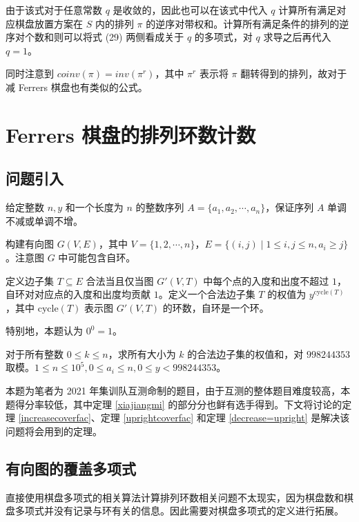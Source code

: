 \documentclass{noithesis}
\begin{document}
	由于该式对于任意常数 $q$ 是收敛的，因此也可以在该式中代入 $q$ 计算所有满足对应棋盘放置方案在 $S$ 内的排列 $\pi$ 的逆序对带权和。计算所有满足条件的排列的逆序对个数和则可以将式 (29) 两侧看成关于 $q$ 的多项式，对 $q$ 求导之后再代入 $q=1$。
	
	同时注意到 $coinv(\pi) = inv(\pi^r)$，其中 $\pi^r$ 表示将 $\pi$ 翻转得到的排列，故对于减 Ferrers 棋盘也有类似的公式。
	
	\section{Ferrers 棋盘的排列环数计数}
	
	\subsection{问题引入}
	
	\begin{problem}
	给定整数 $n,y$ 和一个长度为 $n$ 的整数序列 $A = \{a_1,a_2,\cdots,a_n\}$，保证序列 $A$ 单调不减或单调不增。
	
	构建有向图 $G(V,E)$，其中 $V = \{1,2,\cdots,n\}$，$E = \{(i,j) \mid 1 \leq i,j \leq n, a_i \geq j\}$。注意图 $G$ 中可能包含自环。
	
	定义边子集 $T \subseteq E$ 合法当且仅当图 $G'(V,T)$ 中每个点的入度和出度不超过 $1$，自环对对应点的入度和出度均贡献 $1$。定义一个合法边子集 $T$ 的权值为 $y^{\mathrm{cycle}(T)}$，其中 $\mathrm{cycle}(T)$ 表示图 $G'(V,T)$ 的环数，自环是一个环。
		
	特别地，本题认为 $0^0=1$。
	
	对于所有整数 $0 \leq k \leq n$，求所有大小为 $k$ 的合法边子集的权值和，对 $998244353$ 取模。$1 \leq n \leq 10^5,0 \leq a_i \leq n , 0 \leq y < 998244353$。
	\end{problem}

	本题为笔者为 2021 年集训队互测命制的题目，由于互测的整体题目难度较高，本题得分率较低，其中定理 \ref{xiajiangmi} 的部分分也鲜有选手得到。下文将讨论的定理  \ref{increasecoverfac}、定理 \ref{uprightcoverfac} 和定理 \ref{decrease=upright} 是解决该问题将会用到的定理。
	
	\subsection{有向图的覆盖多项式}
	
	直接使用棋盘多项式的相关算法计算排列环数相关问题不太现实，因为棋盘数和棋盘多项式并没有记录与环有关的信息。因此需要对棋盘多项式的定义进行拓展。
	
\end{document}
